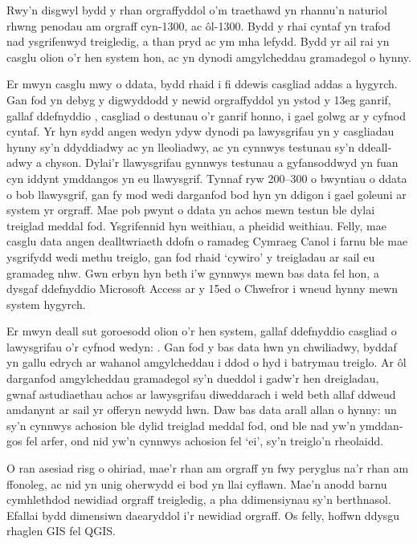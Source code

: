 \begin{welsh}
Rwy'n disgwyl bydd y rhan orgraffyddol o'm traethawd yn rhannu'n naturiol rhwng penodau am orgraff cyn-1300, ac \^ol-1300. Bydd y rhai cyntaf yn trafod nad ysgrifenwyd  treigledig, a than pryd ac ym mha lefydd. Bydd yr ail rai yn casglu olion o'r hen system hon, ac yn dynodi amgylcheddau gramadegol o hynny.

Er mwyn casglu mwy o ddata, bydd rhaid i fi ddewis casgliad addas a hygyrch. Gan fod yn debyg y digwyddodd y newid orgraffyddol yn ystod y 13eg ganrif, gallaf ddefnyddio \textcite{isaac_rhyddiaith_2013}, casgliad o destunau o'r ganrif honno, i gael golwg ar y cyfnod cyntaf.  Yr hyn sydd angen wedyn ydyw dynodi pa lawysgrifau yn y casgliadau hynny sy'n ddyddiadwy ac yn lleoliadwy, ac yn cynnwys testunau sy'n ddealladwy a chyson. Dylai'r llawysgrifau gynnwys testunau a gyfansoddwyd yn fuan cyn iddynt ymddangos yn eu llawysgrif. Tynnaf ryw 200--300 o bwyntiau o ddata o bob llawysgrif, gan fy mod wedi darganfod bod hyn yn ddigon i gael goleuni ar system yr orgraff. Mae pob pwynt o ddata yn achos mewn testun ble dylai treiglad meddal fod. Ysgrifennid hyn weithiau, a pheidid weithiau. Felly, mae casglu data angen dealltwriaeth ddofn o ramadeg Cymraeg Canol i farnu ble mae ysgrifydd wedi methu treiglo, gan fod rhaid `cywiro' y treigladau ar sail eu gramadeg nhw. Gwn erbyn hyn beth i'w gynnwys mewn bas data fel hon, a dysgaf ddefnyddio Microsoft Access ar y 15ed o Chwefror i wneud hynny mewn system hygyrch.

Er mwyn deall sut goroesodd olion o'r hen system, gallaf ddefnyddio casgliad o lawysgrifau o'r cyfnod wedyn:  \textcite{luft_rhyddiaith_2013}. Gan fod y bas data hwn yn chwiliadwy, byddaf yn gallu edrych ar wahanol amgylcheddau i ddod o hyd i batrymau treiglo. Ar \^ol darganfod amgylcheddau gramadegol sy'n dueddol i gadw'r hen dreigladau, gwnaf astudiaethau achos ar lawysgrifau diweddarach i weld beth allaf ddweud amdanynt ar sail yr offeryn newydd hwn. Daw bas data arall allan o hynny: un sy'n cynnwys achosion ble dylid treiglad meddal fod, ond ble nad yw'n ymddangos fel arfer, ond nid yw'n cynnwys achosion fel  `ei', sy'n treiglo'n rheolaidd. 

O ran asesiad risg o ohiriad, mae'r rhan am orgraff yn fwy peryglus na'r rhan am ffonoleg, ac nid yn unig oherwydd ei bod yn llai cyflawn. Mae'n anodd barnu cymhlethdod newidiad orgraff  treigledig, a pha ddimensiynau sy'n berthnasol. Efallai bydd dimensiwn daearyddol i'r newidiad orgraff. Os felly, hoffwn ddysgu rhaglen GIS fel QGIS. 


\end{welsh}
